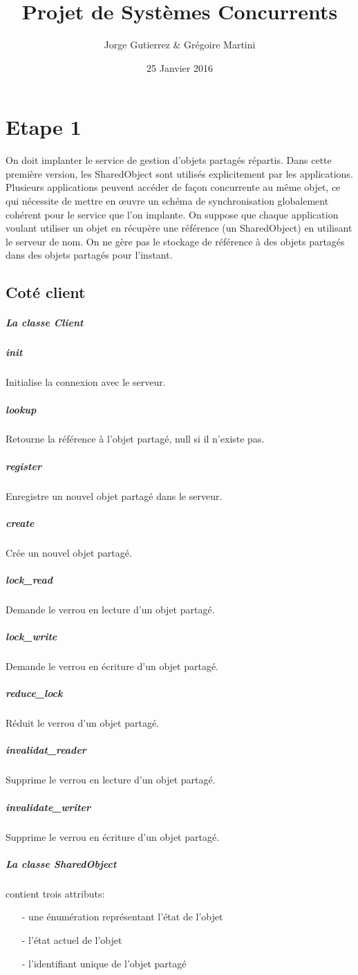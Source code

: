 \documentclass[a4paper,12pt]{article}
\title{Projet de Systèmes Concurrents}
\author{Jorge Gutierrez \& Grégoire Martini}
\date{25 Janvier 2016}
\begin{document}
\maketitle

\bigskip
\bigskip
\bigskip
\tableofcontents
\newpage


\section{Etape 1}

On doit implanter le service de gestion d'objets partagés répartis. Dans cette première version, les 
SharedObject sont utilisés explicitement par les applications. \\

Plusieurs applications peuvent accéder de façon concurrente au même objet, ce qui nécessite de mettre en 
œuvre un schéma de synchronisation globalement cohérent pour le service que l'on implante.
On suppose que chaque application voulant utiliser un objet en récupère une référence (un SharedObject) en 
utilisant le serveur de nom. On ne gère pas le stockage de référence à des objets partagés dans des objets partagés pour l'instant.

\subsection{Coté client}

\bigskip

\subparagraph{La classe Client}

\smallskip

\subparagraph{init}
Initialise la connexion avec le serveur.
\subparagraph{lookup}
Retourne la référence à l'objet partagé, null si il n'existe pas.
\subparagraph{register}
Enregistre un nouvel objet partagé dans le serveur.
\subparagraph{create}
Crée un nouvel objet partagé.
\subparagraph{lock\_read}
Demande le verrou en lecture d'un objet partagé.
\subparagraph{lock\_write}
Demande le verrou en écriture d'un objet partagé.
\subparagraph{reduce\_lock}
Réduit le verrou d'un objet partagé.
\subparagraph{invalidat\_reader}
Supprime le verrou en lecture d'un objet partagé.
\subparagraph{invalidate\_writer}
Supprime le verrou en écriture d'un objet partagé.

\bigskip

\subparagraph{La classe SharedObject}
contient trois attributs:
\begin{itemize}
\item[- une énumération représentant l'état de l'objet]
\item[- l'état actuel de l'objet]
\item[- l'identifiant unique de l'objet partagé]
\end{itemize}
\end{document}
